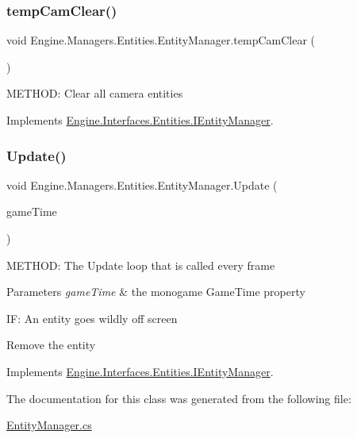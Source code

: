\subsubsection{\texorpdfstring{temp\+Cam\+Clear()}{tempCamClear()}}
{\footnotesize\ttfamily void Engine.\+Managers.\+Entities.\+Entity\+Manager.\+temp\+Cam\+Clear (\begin{DoxyParamCaption}{ }\end{DoxyParamCaption})\hspace{0.3cm}{\ttfamily [inline]}}



M\+E\+T\+H\+OD\+: Clear all camera entities 



Implements \hyperlink{a00442_a04101871e7eef6b222a0cbd6225d0a7a}{Engine.\+Interfaces.\+Entities.\+I\+Entity\+Manager}.

\mbox{\label{a00518_a386e96f9edb12689118de624c559de0f}} 
\subsubsection{\texorpdfstring{Update()}{Update()}}
{\footnotesize\ttfamily void Engine.\+Managers.\+Entities.\+Entity\+Manager.\+Update (\begin{DoxyParamCaption}\item[{Game\+Time}]{game\+Time }\end{DoxyParamCaption})\hspace{0.3cm}{\ttfamily [inline]}}



M\+E\+T\+H\+OD\+: The Update loop that is called every frame 


\begin{DoxyParams}{Parameters}
{\em game\+Time} & the monogame Game\+Time property\\
\hline
\end{DoxyParams}
IF\+: An entity goes wildly off screen

Remove the entity 

Implements \hyperlink{a00442_a1b5aeaf8f2f6ad4a0c93aec1c331c1b2}{Engine.\+Interfaces.\+Entities.\+I\+Entity\+Manager}.



The documentation for this class was generated from the following file\+:\begin{DoxyCompactItemize}
\item 
\hyperlink{a00170}{Entity\+Manager.\+cs}\end{DoxyCompactItemize}
